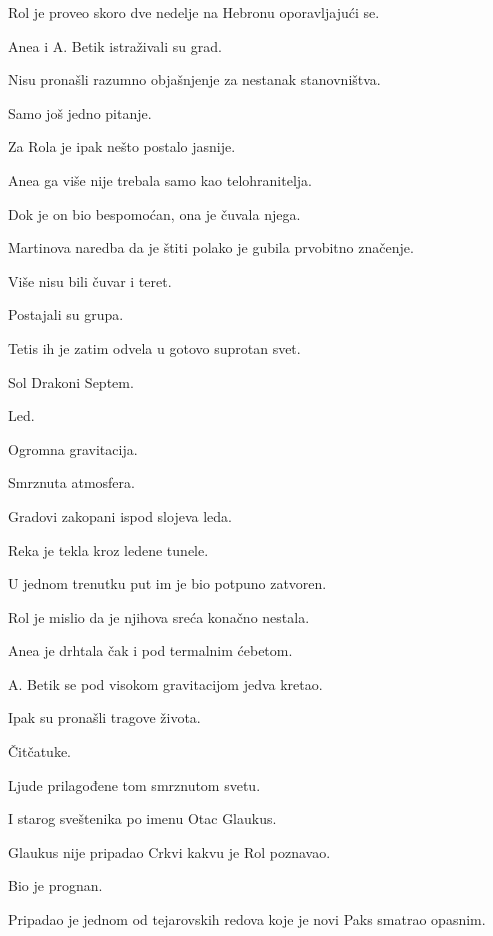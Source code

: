 \bigskip

Rol je proveo skoro dve nedelje na Hebronu oporavljajući se.

Anea i A. Betik istraživali su grad.

Nisu pronašli razumno objašnjenje za nestanak stanovništva.

\bigskip

Samo još jedno pitanje.

\bigskip

Za Rola je ipak nešto postalo jasnije.

Anea ga više nije trebala samo kao telohranitelja.

Dok je on bio bespomoćan, ona je čuvala njega.

Martinova naredba da je štiti polako je gubila prvobitno značenje.

Više nisu bili čuvar i teret.

Postajali su grupa.

\bigskip

Tetis ih je zatim odvela u gotovo suprotan svet.

Sol Drakoni Septem.

\bigskip

Led.

Ogromna gravitacija.

Smrznuta atmosfera.

Gradovi zakopani ispod slojeva leda.

\bigskip

Reka je tekla kroz ledene tunele.

U jednom trenutku put im je bio potpuno zatvoren.

Rol je mislio da je njihova sreća konačno nestala.

Anea je drhtala čak i pod termalnim ćebetom.

A. Betik se pod visokom gravitacijom jedva kretao.

\bigskip

Ipak su pronašli tragove života.

Čitčatuke.

Ljude prilagođene tom smrznutom svetu.

I starog sveštenika po imenu Otac Glaukus.

\bigskip

Glaukus nije pripadao Crkvi kakvu je Rol poznavao.

Bio je prognan.

Pripadao je jednom od tejarovskih redova koje je novi Paks smatrao opasnim.

